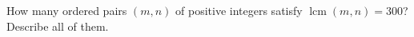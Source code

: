 How many ordered pairs $(m,n)$ of positive integers satisfy $\operatorname{lcm}(m,n)=300$? Describe all of them.
